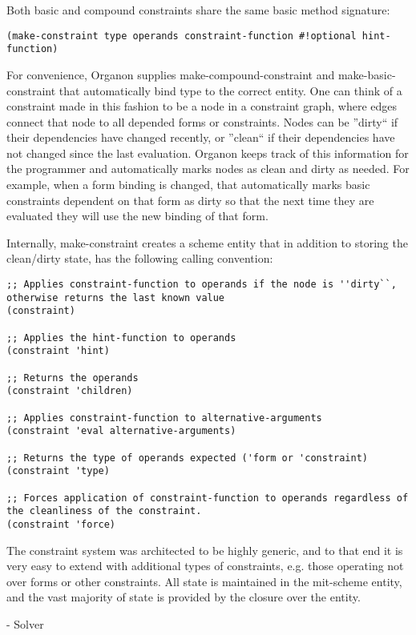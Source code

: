 \documentclass[12pt,a4paper]{article}
\begin{document}
Both basic and compound constraints share the same basic method signature:
\begin{lstlisting}
(make-constraint type operands constraint-function #!optional hint-function)

\end{lstlisting}
For convenience, Organon supplies make-compound-constraint and make-basic-constraint that automatically bind type to the correct entity. One can think of a constraint made in this fashion to be a node in a constraint graph, where edges connect that node to all depended forms or constraints.  Nodes can be ''dirty`` if their dependencies have changed recently, or ''clean`` if their dependencies have not changed since the last evaluation.  Organon keeps track of this information for the programmer and automatically marks nodes as clean and dirty as needed.  For example, when a form binding is changed, that automatically marks basic constraints dependent on that form as dirty so that the next time they are evaluated they will use the new binding of that form.

Internally, make-constraint creates a scheme entity that in addition to storing the clean/dirty state, has the following calling convention:
\begin{lstlisting}
;; Applies constraint-function to operands if the node is ''dirty``, otherwise returns the last known value
(constraint)

;; Applies the hint-function to operands
(constraint 'hint)

;; Returns the operands
(constraint 'children)

;; Applies constraint-function to alternative-arguments
(constraint 'eval alternative-arguments)

;; Returns the type of operands expected ('form or 'constraint)
(constraint 'type) 

;; Forces application of constraint-function to operands regardless of the cleanliness of the constraint.
(constraint 'force)

\end{lstlisting}
The constraint system was architected to be highly generic, and to that end it is very easy to extend with additional types of constraints, e.g. those operating not over forms or other constraints.   All state is maintained in the mit-scheme entity, and the vast majority of state is provided by the closure over the entity.

- Solver
\end{document}
